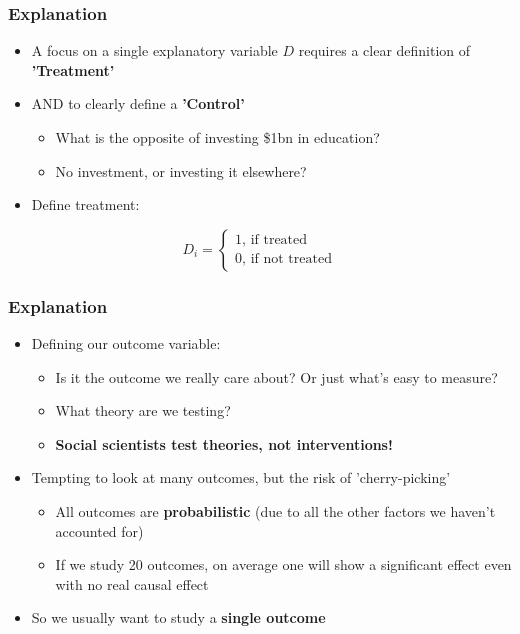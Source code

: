 \documentclass[xcolor=x11names,compress]{beamer}\usepackage[]{graphicx}\usepackage[]{color}
\renewcommand{\(}{\begin{columns}}
\renewcommand{\)}{\end{columns}}
\newcommand{\<}[1]{\begin{column}{#1}}
\renewcommand{\>}{\end{column}}
\begin{document}
\begin{frame}
\frametitle{Explanation}
\begin{itemize}
\item A focus on a single explanatory variable $D$ requires a clear definition of \textbf{'Treatment'}
\pause
\item AND to clearly define a \textbf{'Control'}
\pause
\begin{itemize}
\item What is the opposite of investing \$1bn in education?
\pause
\item No investment, or investing it elsewhere?
\pause
\end{itemize}
\item Define treatment:
\end{itemize}
\[D_i = 
\begin{cases}
1 \text{, if treated} \\
0 \text{, if not treated}
\end{cases}
\]
\end{frame}

\begin{frame}
\frametitle{Explanation}
\begin{itemize}
\item Defining our outcome variable:
\pause
\begin{itemize}
\item Is it the outcome we really care about? Or just what's easy to measure?
\pause
\item What theory are we testing?
\pause
\item \textbf{Social scientists test theories, not interventions!}
\end{itemize}
\pause
\item Tempting to look at many outcomes, but the risk of 'cherry-picking'
\pause
\begin{itemize}
\item All outcomes are \textbf{probabilistic} (due to all the other factors we haven't accounted for)
\pause
\item If we study 20 outcomes, on average one will show a significant effect even with no real causal effect
\pause
\end{itemize}
\item So we usually want to study a \textbf{single outcome}
\end{itemize}
\end{frame}
\end{document}
